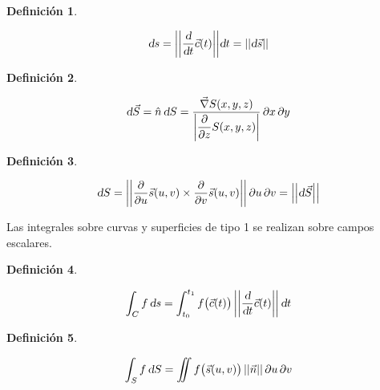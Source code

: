 \documentclass[a5paper,12pt,twoside]{book}
\newtheorem{defn}{{Definición}}[chapter]
\begin{document}
\begin{mdframed}[style=MyFrame1]
    \begin{defn}
    \end{defn}
    \begin{equation*}
        \textsl{d} s = {\left|\left| { \dfrac{\textsl{d}}{\textsl{d} t} \Vec{c}(t) } \right|\right|} \textsl{d} t = {\left|\left| { \textsl{d} \Vec{s} } \right|\right|}
    \end{equation*}
\end{mdframed}

\begin{mdframed}[style=MyFrame1]
    \begin{defn}
    \end{defn}
    \begin{equation*}
        \textsl{d} \Vec{S} = \hat{n} \, \textsl{d} S = \dfrac{\Vec{\nabla} S(x,y,z)}{{\left| { \dfrac{\partial}{\partial z} S(x,y,z) } \right|} } \, \partial x \, \partial y
    \end{equation*}
\end{mdframed}

\begin{mdframed}[style=MyFrame1]
    \begin{defn}
    \end{defn}
    \begin{equation*}
        \textsl{d} S = {\left|\left| { \dfrac{\partial}{\partial u} \Vec{s}(u,v) \times \dfrac{\partial}{\partial v} \Vec{s}(u,v) } \right|\right|} \, \partial u \, \partial v = {\left|\left| { \textsl{d} \Vec{S} } \right|\right|}
    \end{equation*}
\end{mdframed}



Las integrales sobre curvas y superficies de tipo 1 se realizan sobre campos escalares.

\begin{mdframed}[style=MyFrame1]
    \begin{defn}
    \end{defn}
    \begin{equation*}
        \int_C f \, \textsl{d} s = \int_{t_0}^{t_1} f \big( \Vec{c}(t) \big) \, {\left|\left| { \dfrac{\textsl{d}}{\textsl{d} t} \Vec{c}(t) } \right|\right|} \, \textsl{d} t
    \end{equation*}
\end{mdframed}

\begin{mdframed}[style=MyFrame1]
    \begin{defn}
    \end{defn}
    \begin{equation*}
        \int_S f \, \textsl{d} S = \iint f \big( \Vec{s}(u,v) \big) \, {\left|\left| { \Vec{n} } \right|\right|} \, \partial u \, \partial v
    \end{equation*}
\end{mdframed}
\end{document}
